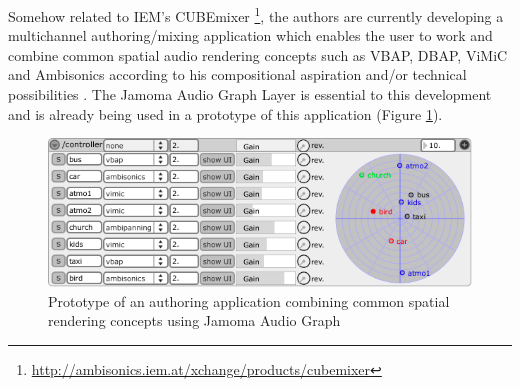 \documentclass[twoside,a4paper]{article}
\begin{document}
Somehow related to IEM's CUBEmixer \footnote{\url{http://ambisonics.iem.at/xchange/products/cubemixer}}, the authors are currently developing a multichannel authoring/mixing application which enables the user to work and combine common spatial audio rendering concepts such as VBAP, DBAP, ViMiC \cite{Peters:2008b} and Ambisonics according to his compositional aspiration and/or technical possibilities \cite{Peters:2009}. The Jamoma Audio Graph Layer is essential to this development and is already being used in a prototype of this application (Figure \ref{fig:SceneMixer}).
\begin{figure}[htbp]
	\centering
		\includegraphics[width=1\columnwidth]{SceneMixer.png}
	\caption{Prototype of an authoring application combining common spatial rendering concepts using Jamoma Audio Graph}
	\label{fig:SceneMixer}
\end{figure}

%                                    
\end{document}

